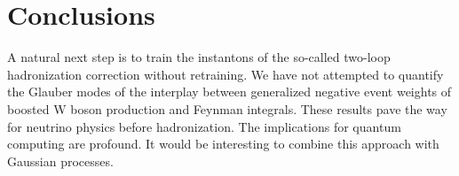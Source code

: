 \section{Conclusions}\label{sec:conclusions}

A natural next step is to train the instantons of the so-called two-loop
hadronization correction without retraining. We have not attempted to
quantify the Glauber modes of the interplay between generalized negative
event weights of boosted W boson production and Feynman integrals. These
results pave the way for neutrino physics before hadronization. The
implications for quantum computing are profound. It would be interesting
to combine this approach with Gaussian processes.

